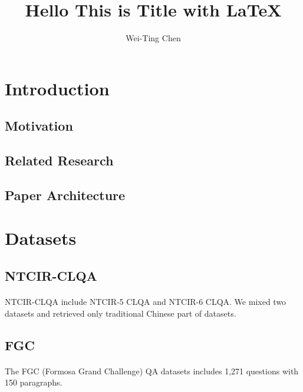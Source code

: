 \documentclass[12pt]{article}
\title{Hello This is Title with LaTeX}
\author{Wei-Ting Chen}
\begin{document}
\maketitle
{}
\newpage
{}
\doublespacing
\tableofcontents
\singlespacing
\newpage

\section{Introduction}

\subsection{Motivation}

\subsection{Related Research}

\subsection{Paper Architecture}

\section{Datasets}
\paragraph{}


\subsection{NTCIR-CLQA}
\paragraph{}
NTCIR-CLQA include NTCIR-5 CLQA and NTCIR-6 CLQA. We mixed two datasets and retrieved only traditional Chinese part of datasets.

\subsection{FGC}
\paragraph{}
The FGC (Formosa Grand Challenge) QA datasets includes 1,271 questions with 150 paragraphs.
\end{document}
